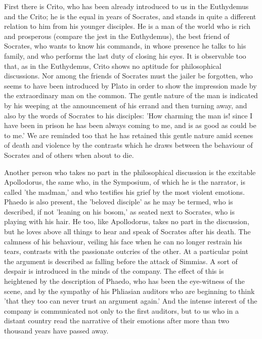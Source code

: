 First there is Crito, who has been already introduced to us in the
Euthydemus and the Crito; he is the equal in years of Socrates, and stands
in quite a different relation to him from his younger disciples. He is a
man of the world who is rich and prosperous (compare the jest in the
Euthydemus), the best friend of Socrates, who wants to know his commands,
in whose presence he talks to his family, and who performs the last duty
of closing his eyes. It is observable too that, as in the Euthydemus,
Crito shows no aptitude for philosophical discussions. Nor among the
friends of Socrates must the jailer be forgotten, who seems to have been
introduced by Plato in order to show the impression made by the
extraordinary man on the common. The gentle nature of the man is indicated
by his weeping at the announcement of his errand and then turning away,
and also by the words of Socrates to his disciples: 'How charming the man
is! since I have been in prison he has been always coming to me, and is as
good as could be to me.' We are reminded too that he has retained this
gentle nature amid scenes of death and violence by the contrasts which he
draws between the behaviour of Socrates and of others when about to die.

Another person who takes no part in the philosophical discussion is the
excitable Apollodorus, the same who, in the Symposium, of which he is the
narrator, is called 'the madman,' and who testifies his grief by the most
violent emotions. Phaedo is also present, the 'beloved disciple' as he may
be termed, who is described, if not 'leaning on his bosom,' as seated next
to Socrates, who is playing with his hair. He too, like Apollodorus, takes
no part in the discussion, but he loves above all things to hear and speak
of Socrates after his death. The calmness of his behaviour, veiling his
face when he can no longer restrain his tears, contrasts with the
passionate outcries of the other. At a particular point the argument is
described as falling before the attack of Simmias. A sort of despair is
introduced in the minds of the company. The effect of this is heightened
by the description of Phaedo, who has been the eye-witness of the scene,
and by the sympathy of his Phliasian auditors who are beginning to think
'that they too can never trust an argument again.' And the intense
interest of the company is communicated not only to the first auditors,
but to us who in a distant country read the narrative of their emotions
after more than two thousand years have passed away.

